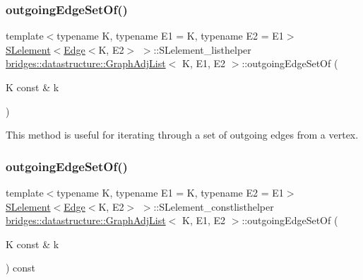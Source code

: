 \subsubsection{\texorpdfstring{outgoing\+Edge\+Set\+Of()}{outgoingEdgeSetOf()}\hspace{0.1cm}{\footnotesize\ttfamily [1/2]}}
{\footnotesize\ttfamily template$<$typename K, typename E1 = K, typename E2 = E1$>$ \\
\hyperlink{classbridges_1_1datastructure_1_1_s_lelement}{S\+Lelement}$<$\hyperlink{classbridges_1_1datastructure_1_1_edge}{Edge}$<$K, E2$>$ $>$\+::S\+Lelement\+\_\+listhelper \hyperlink{classbridges_1_1datastructure_1_1_graph_adj_list}{bridges\+::datastructure\+::\+Graph\+Adj\+List}$<$ K, E1, E2 $>$\+::outgoing\+Edge\+Set\+Of (\begin{DoxyParamCaption}\item[{K const \&}]{k }\end{DoxyParamCaption})\hspace{0.3cm}{\ttfamily [inline]}}



This method is useful for iterating through a set of outgoing edges from a vertex. 

\mbox{\label{classbridges_1_1datastructure_1_1_graph_adj_list_ab0677da029442194925f8167cc2b8638}} 
\subsubsection{\texorpdfstring{outgoing\+Edge\+Set\+Of()}{outgoingEdgeSetOf()}\hspace{0.1cm}{\footnotesize\ttfamily [2/2]}}
{\footnotesize\ttfamily template$<$typename K, typename E1 = K, typename E2 = E1$>$ \\
\hyperlink{classbridges_1_1datastructure_1_1_s_lelement}{S\+Lelement}$<$\hyperlink{classbridges_1_1datastructure_1_1_edge}{Edge}$<$K, E2$>$ $>$\+::S\+Lelement\+\_\+constlisthelper \hyperlink{classbridges_1_1datastructure_1_1_graph_adj_list}{bridges\+::datastructure\+::\+Graph\+Adj\+List}$<$ K, E1, E2 $>$\+::outgoing\+Edge\+Set\+Of (\begin{DoxyParamCaption}\item[{K const \&}]{k }\end{DoxyParamCaption}) const\hspace{0.3cm}{\ttfamily [inline]}}



